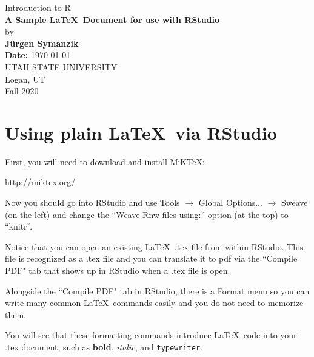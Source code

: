 \documentclass[12pt]{article}
\begin{document}
\begin{titlepage}

\begin{center}
{\large Introduction to R} \\[1.5in]

{\LARGE \bf A Sample \LaTeX\ Document for use with RStudio} \\[.4in]
by \\[.4in]
{\bf J\"urgen Symanzik} \\[1in]
{\bf Date:} \today \\[.8in]

UTAH STATE UNIVERSITY \\[.2in]
Logan, UT \\[0.2in]
Fall 2020 \\[0.2in]
\end{center}

\thispagestyle{empty}
\vfill
\end{titlepage}


\newpage 


\tableofcontents


\newpage



\section{Using plain \LaTeX\ via RStudio}

First, you will need to download and install  MiKTeX: 

\url{http://miktex.org/}

Now you should go into RStudio and use Tools $\rightarrow$ Global Options... $\rightarrow$ Sweave (on the left) and change the ``Weave Rnw files using:'' option (at the top) to ``knitr''. 

Notice that you can open an existing \LaTeX\ .tex file from within RStudio.
This file is recognized as a .tex file and you can translate it to pdf
via the ``Compile PDF" tab that shows up in RStudio when a .tex file is open.

Alongside the ``Compile PDF" tab in RStudio, there is a Format menu so you can write many common \LaTeX\ commands easily and you do not need to memorize them.

You will see that these formatting commands introduce \LaTeX\ code into your .tex document, such as \textbf{bold}, \emph{italic}, and \texttt{typewriter}.
\end{document}
